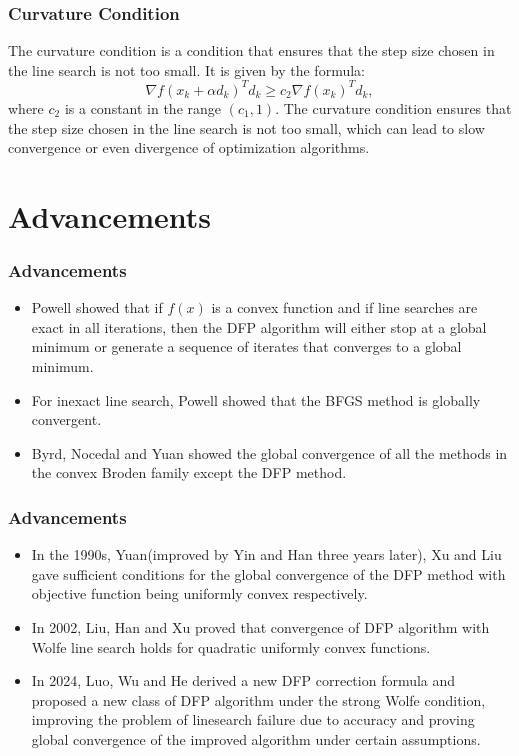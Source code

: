 \documentclass{beamer}
\begin{document}
\begin{frame}
    \frametitle{Curvature Condition}
The curvature condition is a condition that ensures that the step size chosen in the line search is not too small. 
It is given by the formula:
\[\nabla f(x_k + \alpha d_k)^T d_k \geq c_2 \nabla f(x_k)^T d_k,\tag{2.3} \]
where $c_2$ is a constant in the range $(c_1, 1)$. The curvature condition ensures that the step size chosen in the line search is not too small, which can lead to slow convergence or even divergence of optimization algorithms.


\end{frame}






\section{Advancements}

\begin{frame}
    \frametitle{Advancements}
    \begin{itemize}
    \item Powell\cite{Po1} showed that if $f(x)$ is a convex function and if line searches are exact in all iterations, then the DFP algorithm will either stop at a global minimum or generate a sequence of iterates that converges to a global minimum. 
    \item For inexact line search, Powell\cite{Po2} showed that the BFGS method is globally convergent. 
    \item Byrd, Nocedal and Yuan\cite{BNY} showed the global convergence of all the methods in the convex Broden family except the DFP method.

\end{itemize}
\end{frame}

\begin{frame}
    \frametitle{Advancements}
\begin{itemize}
    \item In the 1990s, Yuan\cite{Yuan}(improved by Yin and Han\cite{YH} three years later), Xu and Liu\cite{XL} gave sufficient conditions for the global convergence of the DFP method with objective function being uniformly convex respectively.
    \item In 2002, Liu, Han and Xu\cite{LHX} proved that convergence of DFP algorithm with Wolfe line search holds for quadratic uniformly convex functions.
    \item In 2024, Luo, Wu and He\cite{LWH} derived a new DFP correction formula and proposed a new class of DFP algorithm under the strong Wolfe condition, improving the problem of linesearch failure due to accuracy and proving global convergence of the improved algorithm under certain assumptions.
\end{itemize}
\end{frame}
\end{document}
